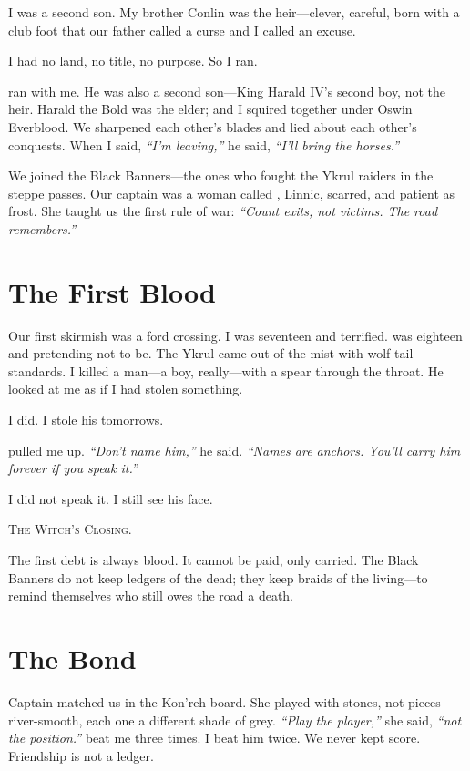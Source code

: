 \documentclass[11pt,a5paper]{book}
\newenvironment{witchclosing}
  {\begin{quoting}[font={small\itshape}, leftmargin=2em, rightmargin=2em]\noindent\textsc{The Witch's Closing.}\par}
  {\end{quoting}}
\begin{document}
\epigraph{I was a second son. My brother Conlin was the heir---clever, careful, born with a club foot that our father called a curse and I called an excuse.}{\braedon}

\lettrine{I}{} had no land, no title, no purpose. So I ran.

\baldvyn{} ran with me. He was also a second son---King Harald IV's second boy, not the heir. Harald the Bold was the elder; \baldvyn{} and I squired together under Oswin Everblood. We sharpened each other's blades and lied about each other's conquests. When I said, \textit{``I'm leaving,''} he said, \textit{``I'll bring the horses.''}

We joined the Black Banners---the ones who fought the Ykrul raiders in the steppe passes. Our captain was a woman called \soren{}, Linnic, scarred, and patient as frost. She taught us the first rule of war: \textit{``Count exits, not victims. The road remembers.''}

\section*{The First Blood}
Our first skirmish was a ford crossing. I was seventeen and terrified. \baldvyn{} was eighteen and pretending not to be. The Ykrul came out of the mist with wolf-tail standards. I killed a man---a boy, really---with a spear through the throat. He looked at me as if I had stolen something.

I did. I stole his tomorrows.

\baldvyn{} pulled me up. \textit{``Don't name him,''} he said. \textit{``Names are anchors. You'll carry him forever if you speak it.''}

I did not speak it. I still see his face.

\begin{witchclosing}
The first debt is always blood. It cannot be paid, only carried. The Black Banners do not keep ledgers of the dead; they keep braids of the living---to remind themselves who still owes the road a death.
\end{witchclosing}

\section*{The Bond}
Captain \soren{} matched us in the Kon'reh board. She played with stones, not pieces---river-smooth, each one a different shade of grey. \textit{``Play the player,''} she said, \textit{``not the position.''} \baldvyn{} beat me three times. I beat him twice. We never kept score. Friendship is not a ledger.
\end{document}

